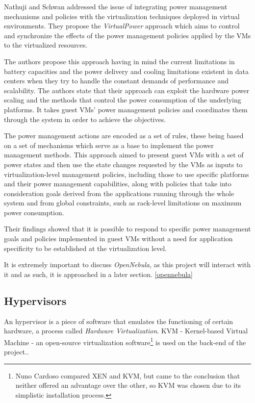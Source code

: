 Nathuji and Schwan addressed the issue of integrating power management mechanisms and policies with the virtualization techniques deployed in virtual environments. They propose the \textit{VirtualPower} approach which aims to control and synchronize the effects of the power management policies applied by the VMs to the virtualized resources. 

The authors propose this approach having in mind the current limitations in battery capacities and the power delivery and cooling limitations existent in data centers when they try to handle the constant demands of performance and scalability. The authors state that their approach  can exploit the hardware power scaling and the methods that control the power consumption of the underlying platforms. It takes guest VMs' power management policies and coordinates them through the system in order to achieve the objectives. 

The power management actions are encoded as a set of rules, these being based on a set of mechanisms which serve as a base to implement the power management methods. This approach aimed to present guest VMs with a set of power states and then use the state changes requested by the VMs as inputs to virtualization-level management policies, including those to use specific platforms and their power management capabilities, along with policies that take into consideration goals derived from the applications running through the whole system and from global constraints, such as rack-level limitations on maximum power consumption. 

Their findings showed that it is possible to respond to specific power management goals and policies implemented in guest VMs without a need for application specificity to be established at the virtualization level. \cite{virtualpower}

It is extremely important to discuss \textit{OpenNebula}, as this project will interact with it and as such, it is approached in a later section. \ref{opennebula}

\subsection{Hypervisors}\label{hyper}

An hypervisor is a piece of software that emulates the functioning of certain hardware, a process called \textit{Hardware Virtualization}. KVM - Kernel-based Virtual Machine - an open-source virtualization software\footnote{Nuno Cardoso compared XEN and KVM, but came to the conclusion that neither offered an advantage over the other, so KVM was chosen due to its simplistic installation process.} is used on the back-end of the project..

